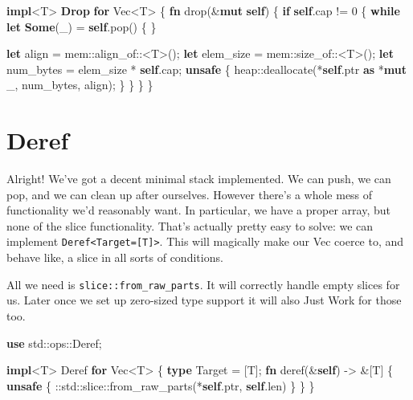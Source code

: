 \documentclass[a4paper,]{book}
\newenvironment{Shaded}{\begin{snugshade}}{\end{snugshade}}
\newcommand{\KeywordTok}[1]{\textcolor[rgb]{0.13,0.29,0.53}{\textbf{{#1}}}}
\newcommand{\DecValTok}[1]{\textcolor[rgb]{0.00,0.00,0.81}{{#1}}}
\newcommand{\NormalTok}[1]{{#1}}
\begin{document}
\begin{Shaded}
\begin{Highlighting}[]
\KeywordTok{impl}\NormalTok{<T> }\KeywordTok{Drop} \KeywordTok{for} \NormalTok{Vec<T> \{}
    \KeywordTok{fn} \NormalTok{drop(&}\KeywordTok{mut} \KeywordTok{self}\NormalTok{) \{}
        \KeywordTok{if} \KeywordTok{self}\NormalTok{.cap != }\DecValTok{0} \NormalTok{\{}
            \KeywordTok{while} \KeywordTok{let} \KeywordTok{Some}\NormalTok{(_) = }\KeywordTok{self}\NormalTok{.pop() \{ \}}

            \KeywordTok{let} \NormalTok{align = mem::align_of::<T>();}
            \KeywordTok{let} \NormalTok{elem_size = mem::size_of::<T>();}
            \KeywordTok{let} \NormalTok{num_bytes = elem_size * }\KeywordTok{self}\NormalTok{.cap;}
            \KeywordTok{unsafe} \NormalTok{\{}
                \NormalTok{heap::deallocate(*}\KeywordTok{self}\NormalTok{.ptr }\KeywordTok{as} \NormalTok{*}\KeywordTok{mut} \NormalTok{_, num_bytes, align);}
            \NormalTok{\}}
        \NormalTok{\}}
    \NormalTok{\}}
\NormalTok{\}}
\end{Highlighting}
\end{Shaded}

\section{Deref}\label{sec--vec-deref}

Alright! We've got a decent minimal stack implemented. We can push, we
can pop, and we can clean up after ourselves. However there's a whole
mess of functionality we'd reasonably want. In particular, we have a
proper array, but none of the slice functionality. That's actually
pretty easy to solve: we can implement
\texttt{Deref\textless{}Target={[}T{]}\textgreater{}}. This will
magically make our Vec coerce to, and behave like, a slice in all sorts
of conditions.

All we need is \texttt{slice::from\_raw\_parts}. It will correctly
handle empty slices for us. Later once we set up zero-sized type support
it will also Just Work for those too.

\begin{Shaded}
\begin{Highlighting}[]
\KeywordTok{use} \NormalTok{std::ops::Deref;}

\KeywordTok{impl}\NormalTok{<T> Deref }\KeywordTok{for} \NormalTok{Vec<T> \{}
    \KeywordTok{type} \NormalTok{Target = [T];}
    \KeywordTok{fn} \NormalTok{deref(&}\KeywordTok{self}\NormalTok{) -> &[T] \{}
        \KeywordTok{unsafe} \NormalTok{\{}
            \NormalTok{::std::slice::from_raw_parts(*}\KeywordTok{self}\NormalTok{.ptr, }\KeywordTok{self}\NormalTok{.len)}
        \NormalTok{\}}
    \NormalTok{\}}
\NormalTok{\}}
\end{Highlighting}
\end{Shaded}
\end{document}
